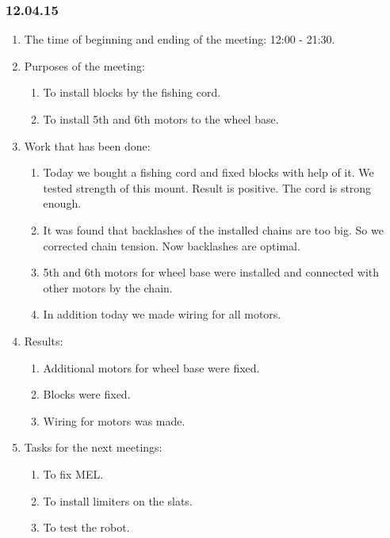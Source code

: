 \subsubsection{12.04.15}
\begin{enumerate}
	
	\item The time of beginning and ending of the meeting: 12:00 - 21:30.
	
	\item Purposes of the meeting: 
	\begin{enumerate}
		
		\item To install blocks by the fishing cord.
		
		\item To install 5th and 6th motors to the wheel base.

	\end{enumerate}

	\item Work that has been done:
	\begin{enumerate}
		
		\item Today we bought a fishing cord and fixed blocks with help of it. We tested strength of this mount. Result is positive. The cord is strong enough.
		
		\item It was found that backlashes of the installed chains are too big. So we corrected chain tension. Now backlashes are optimal.
		
        \item 5th and 6th motors for wheel base were installed and connected with other motors by the chain.
        
        \item In addition today we made wiring for all motors.

	\end{enumerate}
	
	\item Results:
	\begin{enumerate}
		
		\item Additional motors for wheel base were fixed.
		
		\item Blocks were fixed.
		
        \item Wiring for motors was made.
		
	\end{enumerate}
	
	\item Tasks for the next meetings:
	\begin{enumerate}
		
		\item To fix MEL.
		
		\item To install limiters on the slats.
		
        \item To test the robot.
			
	\end{enumerate}
\end{enumerate}
\fillpage
